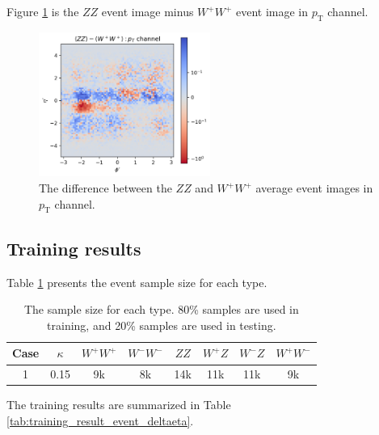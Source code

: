 \documentclass[12pt]{article}
\begin{document}
		Figure \ref{fig:event_image_PT_ZZ-W+W+_deltaeta} is the $ZZ$ event image minus $W^{+}W^{+}$ event image in $p_\text{T}$ channel.
		\begin{figure}[htpb]
			\centering
			\includegraphics[width=0.5\textwidth]{event_image_PT_ZZ-W+W+-deltaeta.png}
			\caption{The difference between the $ZZ$ and $W^{+}W^{+}$ average event images in $p_\text{T}$ channel.}
			\label{fig:event_image_PT_ZZ-W+W+_deltaeta}
		\end{figure}

	\subsection{Training results}%
	\label{sub:training_results_deltaeta}
		Table \ref{tab:full_event_sample_size_deltaeta} presents the event sample size for each type.
		\begin{table}[htpb]
			\centering
			\caption{The sample size for each type. 80\% samples are used in training, and 20\% samples are used in testing.}
			\label{tab:full_event_sample_size_deltaeta}
			\begin{tabular}{c|c|c|c|c|c|c|c}
			Case & $\kappa$ & $W^+W^+$ & $W^-W^-$ & $ZZ$ & $W^+Z$ & $W^-Z$ & $W^+W^-$ \\ \hline
			1    & 0.15     & 9k      & 8k      & 14k  & 11k    & 11k    & 9k      
			\end{tabular}
		\end{table}

		The training results are summarized in Table \ref{tab:training_result_event_deltaeta}. 
		
\end{document}
